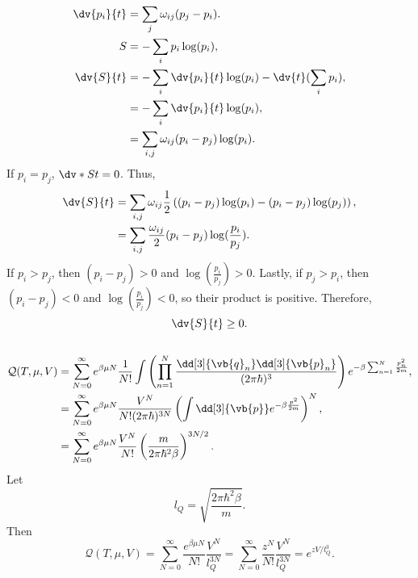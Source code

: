 \documentclass[a4paper,12pt,twoside]{article}
\begin{document}
\begin{multicols*}{2}
\subsection{}%
\begin{align}
	\dv{p_i}{t} &= \sum_{j} \omega_{ij}(p_j-p_i).\\
	S &= -\sum_{i} p_i\log(p_i),\\
	\dv{S}{t} &= -\sum_{i}\dv{p_i}{t}\log(p_i) - \dv{t}(\sum_{i}p_i),\\
	&= -\sum_{i}\dv{p_i}{t}\log(p_i),\\
	&= \sum_{i,j} \omega_{ij}(p_i-p_j)\log(p_i).
\end{align}
If $p_i = p_j$, $\dv*{S}{t} = 0$.
Thus,
\begin{align}
	\dv{S}{t} &= \sum_{i,j} \omega_{ij}\frac{1}{2}\left((p_i-p_j)\log(p_i)-(p_i-p_j)\log(p_j)\right),\\
	&= \sum_{i,j} \frac{\omega_{ij}}{2}(p_i-p_j)\log(\frac{p_i}{p_j}).
\end{align}
If $p_i > p_j$, then $(p_i-p_j) > 0$ and $\log(\frac{p_i}{p_j}) > 0$.
Lastly, if $p_j > p_i$, then $(p_i-p_j) < 0$ and $\log(\frac{p_i}{p_j}) < 0$, so their product is positive.
Therefore,
\begin{equation}
	\dv{S}{t} \geq 0.
\end{equation}
\subsection{}%
\subsubsection{}
\begin{align}
\mathcal{Q}(T,\mu,V) &= \sum_{N=0}^\infty e^{\beta \mu N} \frac{1}{N!} \int \left(\prod_{n=1}^N \frac{\dd[3]{\vb{q}_n}\dd[3]{\vb{p}_n}}{(2\pi \hbar)^3}\right) e^{-\beta \sum_{n=1}^N \frac{p_n^2}{2m}},\\
&= \sum_{N=0}^\infty e^{\beta \mu N} \frac{V^N}{N!(2\pi \hbar)^{3N}} \left(\int \dd[3]{\vb{p}} e^{-\beta \frac{p^2}{2m}}\right)^N,\\
&= \sum_{N=0}^\infty e^{\beta \mu N} \frac{V^N}{N!} \left(\frac{m}{2\pi \hbar^2 \beta}\right)^{3N/2}.
\end{align}
Let
\begin{equation}
	l_Q = \sqrt{\frac{2\pi \hbar^2 \beta}{m}}.
\end{equation}
Then
\begin{equation}
	\mathcal{Q}(T,\mu,V) = \sum_{N=0}^\infty  \frac{e^{\beta \mu N}}{N!} \frac{V^N}{l_Q^{3N}} = \sum_{N=0}^\infty  \frac{z^N}{N!} \frac{V^N}{l_Q^{3N}} = e^{z V / l_Q^3}.
\end{equation}

\end{multicols*}
\end{document}
